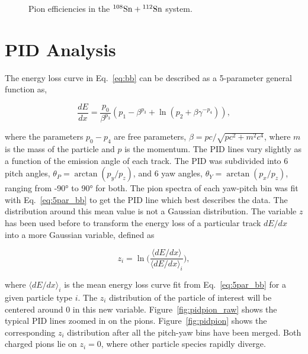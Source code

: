 \begin{figure}[!htb]%
    \centering
    \qquad
 	\caption{ Pion efficiencies in the ${}^{108}\mathrm{Sn} + {}^{112}\mathrm{Sn}$ system. }
	\label{fig:108_eff}
\end{figure}



\section{PID Analysis}
\label{sec:pid}



The energy loss curve in Eq.~\ref{eq:bb} can be described as a 5-parameter general function as, 

\begin{equation}
\frac{dE}{dx} = \frac{p_0}{\beta^{p_3}}(p_1 - \beta^{p_3} + \ln(p_2 + {\beta\gamma}^{-p_4})),
\label{eq:5par_bb}
\end{equation}

where the parameters $p_0-p_4$ are free parameters, $\beta= pc/\sqrt{{pc}^2 + m^2c^4}$, where $m$ is the mass of the particle and $p$ is the momentum. The PID lines vary slightly as a function of the emission angle of each track. The PID was subdivided into 6 pitch angles, $\theta_P = \arctan(p_y/p_z)$, and 6 yaw angles, $\theta_Y = \arctan(p_x/p_z)$, ranging from \ang{-90} to \ang{90} for both. The pion spectra of each yaw-pitch bin was fit with Eq.~\ref{eq:5par_bb} to get the PID line which best describes the data. The distribution around this mean value is not a Gaussian distribution. The variable $z$ has been used before to transform the energy loss of a particular track $dE/dx$ into a more Gaussian variable, defined as

\begin{equation}
z_i = \ln\Big(\frac{\langle dE/dx\rangle}{\langle dE/dx\rangle_i}\Big),
\end{equation}

where $\langle dE/dx\rangle_i$ is the mean energy loss curve fit from Eq.~\ref{eq:5par_bb} for a given particle type $i$. The $z_i$ distribution of the particle of interest will be centered around 0 in this new variable. Figure~\ref{fig:pidpion_raw} shows the typical PID lines zoomed in on the pions. Figure~\ref{fig:pidpion} shows the corresponding $z_i$ distribution after all the pitch-yaw bins have been merged. Both charged pions lie on $z_i=0$, where other particle species rapidly diverge. 


